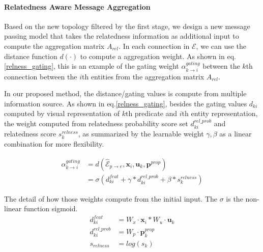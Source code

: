 \paragraph{Relatedness Aware Message Aggregation}
Based on the new topology filtered by the first stage, we design a new message passing model that takes the relatedness information as additional input to compute the aggregation matrix $A_{rel}$. 
In each connection in $\mathcal{E}$, we can use the distance function $d(\cdot)$ to compute a aggregation weight. 
As shown in eq.\ref{relness_gating}, this is an example of the gating weight $\alpha_{k\rightarrow i}^{gating}$ between the $k$th connection between the $i$th entities from the aggregation matrix $A_{rel}$. 

In our proposed method, the distance/gating values is compute from multiple information source.
As shown in eq.\ref{relness_gating}, besides the gating values $d_{ki}$ computed by visual representation of $k$th predicate and $i$th entity representation, the weight computed from relatedness probability score set $d_{ki}^{rel\_prob}$ and relatedness score $s^{relness}_{k}$, as summarized by the learnable weight $\gamma, \beta$ as a linear combination for more flexibility. 

\begin{align}
    \alpha^{gating}_{k \rightarrow i} 
    &= d(\hat{\mathcal{E}}_{p \rightarrow e}, \mathbf{x}_{i}, \mathbf{u}_k, \mathbf{p}^{prop}) \\
    &= \sigma(d_{ki}^{feat} + \gamma * d_{ki}^{rel\_prob} + \beta * s^{relness}_{k}) 
    \label{relness_gating}
\end{align}

The detail of how those weights compute from the initial input. The $\sigma$ is the non-linear function sigmoid.
\begin{align}
    d_{ki}^{feat} &= W_x \cdot \mathbf{x}_i * W_u \cdot \mathbf{u}_{k} \\
    d_{ki}^{rel\_prob} &= W_p \cdot \mathbf{p}^{prop}_{k} \\
    s_{relness} &= log(s_{k})
\end{align}



